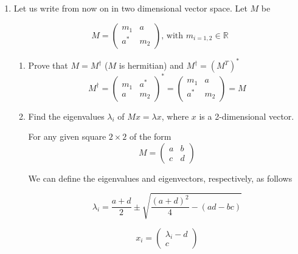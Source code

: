 \documentclass[11pt,letterpaper]{article}%
\begin{document}
\begin{enumerate}[label=\Large{\textbf{\arabic*.}}]
\item{
Let us write from now on in two dimensional vector space. Let $M$ be

\begin{equation}
\label{matrixM}
M = 
\begin{pmatrix}
m_1 & a\\
a^* & m_2
\end{pmatrix}
\text{, with } m_{i=1,2} \in \mathbb{R}
\end{equation}

\begin{enumerate}[label=\textit{\roman*.}]
\item{
Prove that $M = M^\dag$ ($M$ is hermitian) and $M^\dag = (M^T)^*$
\begin{equation}
\label{proofM}
M^\dag =
\begin{pmatrix}
m_1 & a^*\\
a & m_2
\end{pmatrix}^* =
\begin{pmatrix}
m_1 & a\\
a^* & m_2
\end{pmatrix} = M
\end{equation}
}

\item{
Find the eigenvalues $\lambda_i$ of $Mx=\lambda x$, where $x$ is a 2-dimensional vector.

\renewcommand\theequation{4.\alph{equation}}
\setcounter{equation}{0}
For any given square $2\times2$ of the form
\begin{equation}
\label{matrixA}
M = 
\begin{pmatrix}
a & b\\
c & d
\end{pmatrix}
\end{equation}

We can define the eigenvalues and eigenvectors, respectively, as follows

\begin{equation}
\label{eigenval}
\lambda_i = \frac{a+d}{2} \pm \sqrt{\frac{(a+d)^2}{4} - \left( ad - bc \right)}
\end{equation}

\begin{equation}
\label{eigenvec}
x_i = 
\begin{pmatrix}
\lambda_i - d\\
c
\end{pmatrix}
\end{equation}

}
\end{enumerate}}
\end{enumerate}
\end{document}
